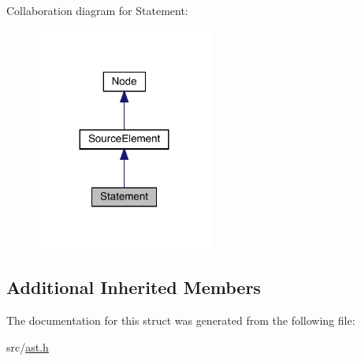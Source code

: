 Collaboration diagram for Statement\+:\nopagebreak
\begin{figure}[H]
\begin{center}
\leavevmode
\includegraphics[width=164pt]{struct_statement__coll__graph}
\end{center}
\end{figure}
\subsection*{Additional Inherited Members}


The documentation for this struct was generated from the following file\+:\begin{DoxyCompactItemize}
\item 
src/\hyperlink{ast_8h}{ast.\+h}\end{DoxyCompactItemize}
